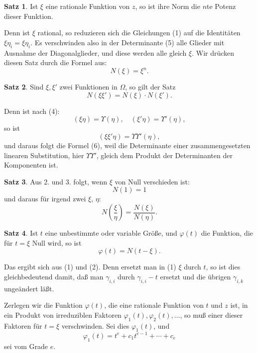 \documentclass[12pt,a4paper]{article}
\theoremstyle{definition}
\newtheorem{satz}{Satz}[section]
\begin{document}
\begin{satz}
Ist $\xi$ eine rationale Funktion von $z$, so ist ihre Norm die $n$te Potenz dieser Funktion.
\end{satz}
Denn ist $\xi$ rational, so reduzieren sich die Gleichungen (1) auf die Identitäten $\xi\eta_i = \xi\eta_i$. Es verschwinden also in der Determinante (5) alle Glieder mit Ausnahme der Diagonalglieder, und diese werden alle gleich $\xi$. Wir drücken diesen Satz durch die Formel aus:
\begin{equation}
N(\xi) = \xi^n.
\end{equation}

\begin{satz}
Sind $\xi, \xi'$ zwei Funktionen in $\Omega$, so gilt der Satz
\begin{equation}
N(\xi\xi') = N(\xi) \cdot N(\xi').
\end{equation}
\end{satz}
Denn ist nach (4):
\[(\xi\eta) = \Upsilon(\eta), \quad (\xi'\eta) = \Upsilon'(\eta),\]
so ist
\[(\xi\xi'\eta) = \Upsilon\Upsilon'(\eta),\]
und daraus folgt die Formel (6), weil die Determinante einer zusammengesetzten linearen Substitution, hier $\Upsilon\Upsilon'$, gleich dem Produkt der Determinanten der Komponenten ist.

\begin{satz}
Aus 2. und 3. folgt, wenn $\xi$ von Null verschieden ist:
\[N(1) = 1\]
und daraus für irgend zwei $\xi$, $\eta$:
\[N\left(\frac{\xi}{\eta}\right) = \frac{N(\xi)}{N(\eta)}.\]
\end{satz}

\begin{satz}
Ist $t$ eine unbestimmte oder variable Größe, und $\varphi(t)$ die Funktion, die für $t = \xi$ Null wird, so ist
\begin{equation}
\varphi(t) = N(t - \xi).
\end{equation}
\end{satz}
Das ergibt sich aus (1) und (2). Denn ersetzt man in (1) $\xi$ durch $t$, so ist dies gleichbedeutend damit, daß man $\gamma_{i,i}$ durch $\gamma_{i,i} - t$ ersetzt und die übrigen $\gamma_{i,k}$ ungeändert läßt.

Zerlegen wir die Funktion $\varphi(t)$, die eine rationale Funktion von $t$ und $z$ ist, in ein Produkt von irreduziblen Faktoren $\varphi_1(t), \varphi_2(t), \ldots$, so muß einer dieser Faktoren für $t = \xi$ verschwinden. Sei dies $\varphi_1(t)$, und
\begin{equation}
\varphi_1(t) = t^e + c_1 t^{e-1} + \cdots + c_e
\end{equation}
sei vom Grade $e$.
\end{document}
